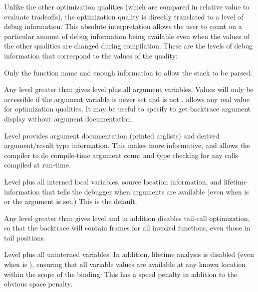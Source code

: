 Unlike the other optimization qualities (which are compared in relative value
to evaluate tradeoffs), the  optimization quality is directly
translated to a level of debug information.  This absolute interpretation
allows the user to count on a particular amount of debug information being
available even when the values of the other qualities are changed during
compilation.  These are the levels of debug information that correspond to the
values of the  quality:
\begin{Lentry}

\item[\code{0}]
Only the function name and enough information to allow the stack to
be parsed.

\item[\code{\w{$>$ 0}}]
Any level greater than  gives level  plus all
argument variables.  Values will only be accessible if the argument
variable is never set and
 is not .  \cmucl{} allows any real value for optimization
qualities.  It may be useful to specify  to get backtrace argument
display without argument documentation.

\item[\code{1}] Level  provides argument documentation
(printed arglists) and derived argument/result type information.
This makes  more informative, and allows the
compiler to do compile-time argument count and type checking for any
calls compiled at run-time.

\item[\code{2}]
Level  plus all interned local variables, source location
information, and lifetime information that tells the debugger when arguments
are available (even when  is  or the argument is set.)  This is
the default.

\item[\code{\w{$>$ 2}}]
Any level greater than  gives level  and in addition
disables tail-call optimization, so that the backtrace will contain
frames for all invoked functions, even those in tail positions.

\item[\code{3}]
Level  plus all uninterned variables.  In addition, lifetime
analysis is disabled (even when  is ), ensuring
that all variable values are available at any known location within
the scope of the binding.  This has a speed penalty in addition to the
obvious space penalty. 
\end{Lentry}

